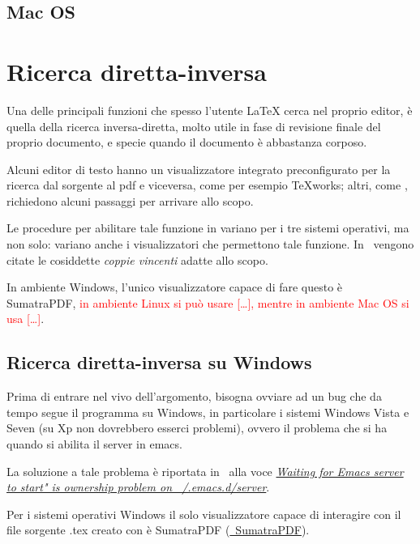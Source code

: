 \documentclass[10pt,a4paper]{article}
\begin{document}
\subsection*{Mac OS}
\label{sec:aspellmac}

\textcolor{red!50}{\lipsum[1]}

\section{Ricerca diretta-inversa}
\label{sec:ricdirinv}

Una delle  principali funzioni che spesso l'utente  \LaTeX{} cerca nel
proprio editor, è quella della ricerca inversa-diretta, molto utile in
fase di revisione finale del proprio documento, e specie quando il
documento è abbastanza corposo.

Alcuni editor di  testo hanno un visualizzatore integrato preconfigurato  
per la  ricerca dal  sorgente al  pdf e  viceversa, come  per
esempio \TeX works; altri,  come \emacs, richiedono alcuni passaggi per
arrivare allo scopo.

Le procedure  per abilitare tale funzione  in \emacs{} variano  per i tre
sistemi  operativi, ma non  solo: variano  anche i  visualizzatori che
permettono tale funzione. In~\parencite{arte:latex} vengono citate le
cosiddette \emph{coppie vincenti} adatte allo scopo.

In ambiente  Windows, l'unico visualizzatore  capace di fare  questo è
SumatraPDF, \textcolor{red}{in  ambiente Linux si può  usare [\ldots],
mentre in ambiente Mac OS si usa [\ldots]}.

\subsection*{Ricerca diretta-inversa su Windows}
\label{sec:fiswin}
Prima di entrare nel vivo dell'argomento, bisogna ovviare ad un bug che
da tempo segue il programma \emacs{} su Windows, in particolare i
sistemi Windows Vista e Seven (su Xp non dovrebbero esserci problemi),
ovvero il problema che si ha quando si abilita il server 
in emacs. %

La soluzione a tale problema è riportata in~\parencite{emacsW32:wiki}
alla voce \href{http://www.emacswiki.org/emacs/EmacsW32#toc49}{\emph{Waiting for Emacs server to start" is ownership problem on ~/.emacs.d/server}}.

Per i sistemi operativi Windows il solo visualizzatore capace di
interagire con il file sorgente \textsf{.tex} creato con \emacs{} è
\textsf{SumatraPDF} (\href{http://blog.kowalczyk.info/software/sumatrapdf/free-pdf-reader.html}{\mano{}~SumatraPDF}).
\end{document}
